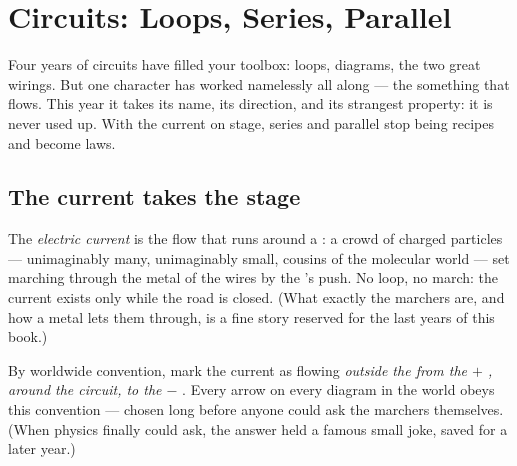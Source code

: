 \chapter{Circuits: Loops, Series, Parallel}\label{ch:g7:circuits-series-parallel}

Four years of circuits have filled your toolbox: loops, diagrams,
the two great wirings. But one character has worked namelessly all
along --- the something that flows. This year it takes its name,
its direction, and its strangest property: it is never used up.
With the current on stage, series and parallel stop being recipes
and become laws.

\section{The current takes the stage}

\begin{definition}\label{def:g7:circuits-series-parallel:current}
The \emph{electric current} is the flow
that runs around a : a crowd of charged particles
--- unimaginably many, unimaginably small, cousins of the
molecular world --- set marching through the metal of the wires
by the 's push. No loop, no march: the current exists only
while the road is closed. (What exactly the marchers are, and how
a metal lets them through, is a fine story reserved for the last
years of this book.)
\end{definition}

\begin{proposition}\label{prop:g7:circuits-series-parallel:direction}
By worldwide convention,  mark the current as
flowing \emph{outside the  from the $+$ , around
the circuit, to the $-$ }. Every arrow on every diagram
in the world obeys this convention --- chosen long before anyone
could ask the marchers themselves. (When physics finally could
ask, the answer held a famous small joke, saved for a later
year.)
\end{proposition}


